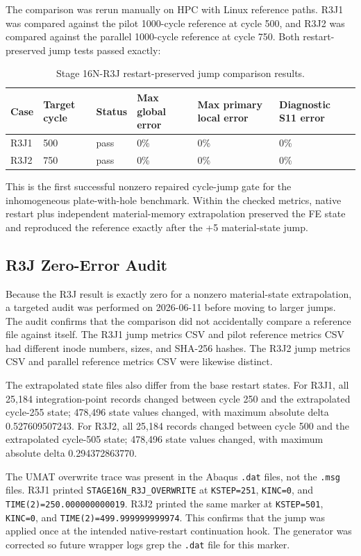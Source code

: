 \documentclass[11pt,a4paper]{article}
\newcommand{\code}[1]{\texttt{#1}}
\begin{document}
The comparison was rerun manually on HPC with Linux reference paths. R3J1 was compared against the pilot 1000-cycle reference at cycle 500, and R3J2 was compared against the parallel 1000-cycle reference at cycle 750. Both restart-preserved jump tests passed exactly:

\begin{table}[H]
\centering
\caption{Stage 16N-R3J restart-preserved jump comparison results.}
\begin{tabular}{llllll}
\toprule
Case & Target cycle & Status & Max global error & Max primary local error & Diagnostic S11 error \\
\midrule
R3J1 & 500 & pass & 0\% & 0\% & 0\% \\
R3J2 & 750 & pass & 0\% & 0\% & 0\% \\
\bottomrule
\end{tabular}
\end{table}

This is the first successful nonzero repaired cycle-jump gate for the inhomogeneous plate-with-hole benchmark. Within the checked metrics, native restart plus independent material-memory extrapolation preserved the FE state and reproduced the reference exactly after the +5 material-state jump.

\subsection{R3J Zero-Error Audit}

Because the R3J result is exactly zero for a nonzero material-state extrapolation, a targeted audit was performed on 2026-06-11 before moving to larger jumps. The audit confirms that the comparison did not accidentally compare a reference file against itself. The R3J1 jump metrics CSV and pilot reference metrics CSV had different inode numbers, sizes, and SHA-256 hashes. The R3J2 jump metrics CSV and parallel reference metrics CSV were likewise distinct.

The extrapolated state files also differ from the base restart states. For R3J1, all 25,184 integration-point records changed between cycle 250 and the extrapolated cycle-255 state; 478,496 state values changed, with maximum absolute delta 0.527609507243. For R3J2, all 25,184 records changed between cycle 500 and the extrapolated cycle-505 state; 478,496 state values changed, with maximum absolute delta 0.294372863770.

The UMAT overwrite trace was present in the Abaqus \code{.dat} files, not the \code{.msg} files. R3J1 printed \code{STAGE16N\_R3J\_OVERWRITE} at \code{KSTEP=251}, \code{KINC=0}, and \code{TIME(2)=250.000000000019}. R3J2 printed the same marker at \code{KSTEP=501}, \code{KINC=0}, and \code{TIME(2)=499.999999999974}. This confirms that the jump was applied once at the intended native-restart continuation hook. The generator was corrected so future wrapper logs grep the \code{.dat} file for this marker.
\end{document}
